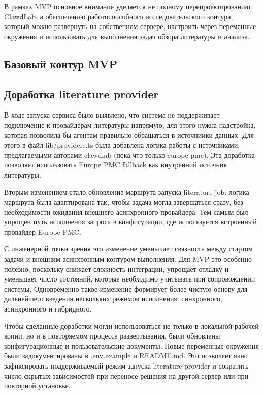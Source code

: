 В рамках MVP основное внимание уделяется не полному перепроектированию ClawdLab, а обеспечению работоспособного исследовательского контура, который можно развернуть на собственном сервере, настроить через переменные окружения и использовать для выполнения задач обзора литературы и анализа.

\subsection{Базовый контур MVP}

\subsection{Доработка literature provider}

В ходе запуска сервиса было выявлено, что система не поддерживает подключение к провайдерам литературы напрямую, для этого нужна надстройка, которая позволила бы агентам правильно обращаться в источниики данных. Для этого в файл lib/providers.ts была добавлена логика работы с источниками, предлагаемыми авторами clawdlab (пока что только europe pmc). Эта доработка позволяет использовать Europe PMC fallback как внутренний источник литературы.

Вторым изменением стало обновление маршрута запуска literature job: логика маршрута была адаптирована так, чтобы задача могла завершаться сразу, без необходимости ожидания внешнего асинхронного провайдера. Тем самым был упрощен путь исполнения запроса в конфигурации, где используется встроенный провайдер Europe PMC.

С инженерной точки зрения это изменение уменьшает связность между стартом задачи и внешним асинхронным контуром выполнения. Для MVP это особенно полезно, поскольку снижает сложность интеграции, упрощает отладку и уменьшает число состояний, которые необходимо учитывать при сопровождении системы. Одновременно такое изменение формирует более чистую основу для дальнейшего введения нескольких режимов исполнения: синхронного, асинхронного и гибридного.

Чтобы сделанные доработки могли использоваться не только в локальной рабочей копии, но и в повторяемом процессе развертывания, были обновлены конфигурационные и пользовательские документы. Новые переменные окружения были задокументированы в .env.example и README.md. Это позволяет явно зафиксировать поддерживаемый режим запуска literature provider и сократить число скрытых зависимостей при переносе решения на другой сервер или при повторной установке.

